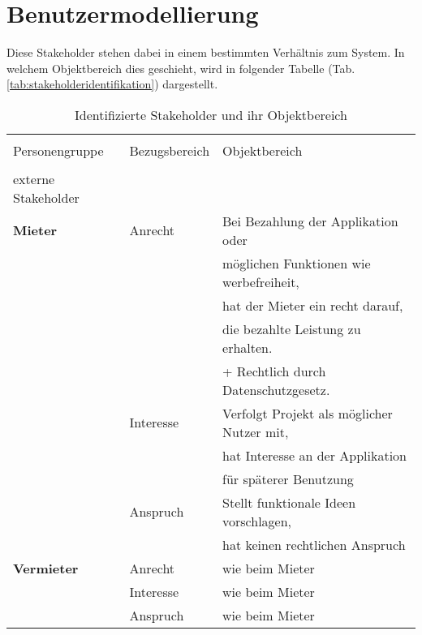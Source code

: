 
\section{Benutzermodellierung}

Diese Stakeholder stehen dabei in einem bestimmten Verhältnis zum System. In welchem Objektbereich dies geschieht, wird in folgender Tabelle (Tab.\ref{tab:stakeholderidentifikation}) dargestellt.


\begin{table}[H]
\caption{Identifizierte Stakeholder und ihr Objektbereich}

\centering
\begin{tabular}{l l l}
\\ [-0.5ex]

\hline\hline
\\ [-0.5ex]
Personengruppe & Bezugsbereich & Objektbereich
\\ [1ex]
\hline
\\ [-0.5ex]
externe Stakeholder  & &\\[1ex]
\textbf{Mieter} & Anrecht & Bei Bezahlung der Applikation oder\\[0.5ex]
               & & möglichen Funktionen wie werbefreiheit,\\[0.5ex]
               & & hat der Mieter ein recht darauf,\\[0.5ex]
               & & die bezahlte Leistung zu erhalten. \\[0.5ex]
               & & + Rechtlich durch Datenschutzgesetz. \\[1ex]



      & Interesse & Verfolgt Projekt als möglicher Nutzer mit, \\[0.5ex]
                & & hat Interesse an der Applikation \\[0.5ex]
                & & für späterer Benutzung\\[1ex]

      & Anspruch  & Stellt funktionale Ideen vorschlagen, \\[0.5ex]
                & & hat keinen rechtlichen Anspruch\\[1ex]


\textbf{Vermieter} & Anrecht & wie beim Mieter \\[0.5ex]
          & Interesse & wie beim Mieter \\[0.5ex]
          & Anspruch & wie beim Mieter \\[1ex]


\end{tabular}
\end{table}
